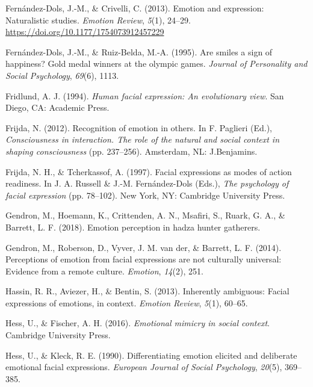 \documentclass[man]{apa6}
\begin{document}
\leavevmode\hypertarget{ref-fernandez2013emotion}{}%
Fernández-Dols, J.-M., \& Crivelli, C. (2013). Emotion and expression: Naturalistic studies. \emph{Emotion Review}, \emph{5}(1), 24--29. \url{https://doi.org/10.1177/1754073912457229}

\leavevmode\hypertarget{ref-fernandez1995smiles}{}%
Fernández-Dols, J.-M., \& Ruiz-Belda, M.-A. (1995). Are smiles a sign of happiness? Gold medal winners at the olympic games. \emph{Journal of Personality and Social Psychology}, \emph{69}(6), 1113.

\leavevmode\hypertarget{ref-fridlund1994human}{}%
Fridlund, A. J. (1994). \emph{Human facial expression: An evolutionary view}. San Diego, CA: Academic Press.

\leavevmode\hypertarget{ref-frijda2012recognition}{}%
Frijda, N. (2012). Recognition of emotion in others. In F. Paglieri (Ed.), \emph{Consciousness in interaction. The role of the natural and social context in shaping consciousness} (pp. 237--256). Amsterdam, NL: J.Benjamins.

\leavevmode\hypertarget{ref-frijda1997facial}{}%
Frijda, N. H., \& Tcherkassof, A. (1997). Facial expressions as modes of action readiness. In J. A. Russell \& J.-M. Fernández-Dols (Eds.), \emph{The psychology of facial expression} (pp. 78--102). New York, NY: Cambridge University Press.

\leavevmode\hypertarget{ref-gendron2018emotion}{}%
Gendron, M., Hoemann, K., Crittenden, A. N., Msafiri, S., Ruark, G. A., \& Barrett, L. F. (2018). Emotion perception in hadza hunter gatherers.

\leavevmode\hypertarget{ref-gendron2014perceptions}{}%
Gendron, M., Roberson, D., Vyver, J. M. van der, \& Barrett, L. F. (2014). Perceptions of emotion from facial expressions are not culturally universal: Evidence from a remote culture. \emph{Emotion}, \emph{14}(2), 251.

\leavevmode\hypertarget{ref-hassin2013inherently}{}%
Hassin, R. R., Aviezer, H., \& Bentin, S. (2013). Inherently ambiguous: Facial expressions of emotions, in context. \emph{Emotion Review}, \emph{5}(1), 60--65.

\leavevmode\hypertarget{ref-hess2016emotional}{}%
Hess, U., \& Fischer, A. H. (2016). \emph{Emotional mimicry in social context}. Cambridge University Press.

\leavevmode\hypertarget{ref-hess1990differentiating}{}%
Hess, U., \& Kleck, R. E. (1990). Differentiating emotion elicited and deliberate emotional facial expressions. \emph{European Journal of Social Psychology}, \emph{20}(5), 369--385.
\end{document}

